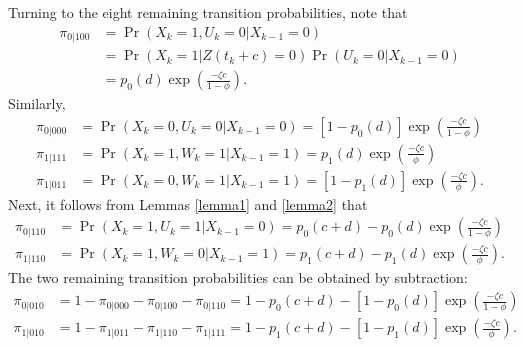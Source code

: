 \documentclass[man, noextraspace, floatsintext]{apa6}\usepackage[]{graphicx}\usepackage[]{color}
\begin{document}
Turning to the eight remaining transition probabilities, note that
\begin{align*}
\pi_{0|100} &= \Pr\left(X_k = 1, U_k = 0 | X_{k-1} = 0\right) \\
&= \Pr\left(X_k = 1 | Z(t_k + c) = 0\right) \Pr\left(U_k = 0 | X_{k-1} = 0\right) \\
&= p_0(d)\exp\left(\frac{- \zeta c}{1 - \phi}\right).
\end{align*}
Similarly,
\begin{align*}
\pi_{0|000} &= \Pr\left(X_k = 0, U_k = 0 | X_{k-1} = 0\right) = \left[1 - p_0(d)\right]\exp\left(\frac{- \zeta c}{1 - \phi}\right) \\
\pi_{1|111} &= \Pr\left(X_k = 1, W_k = 1 | X_{k-1} = 1\right) = p_1(d)\exp\left(\frac{- \zeta c}{\phi}\right) \\
\pi_{1|011} &= \Pr\left(X_k = 0, W_k = 1 | X_{k-1} = 1\right) = \left[1 - p_1(d)\right]\exp\left(\frac{- \zeta c}{\phi}\right).
\end{align*}
Next, it follows from Lemmas \ref{lemma1} and \ref{lemma2} that
\begin{align*}
\pi_{0|110} &= \Pr\left(X_k = 1, U_k = 1 | X_{k-1} = 0\right) = p_0(c + d) - p_0(d) \exp\left(\frac{- \zeta c}{1 - \phi}\right) \\
\pi_{1|110} &= \Pr\left(X_k = 1, W_k = 0 | X_{k-1} = 1\right) = p_1(c + d) - p_1(d) \exp\left(\frac{- \zeta c}{\phi}\right).
\end{align*}
The two remaining transition probabilities can be obtained by subtraction:
\begin{align*}
\pi_{0|010} &= 1 - \pi_{0|000} - \pi_{0|100} - \pi_{0|110} = 1 - p_0(c + d) - \left[1 - p_0(d)\right]\exp\left(\frac{- \zeta c}{1 - \phi}\right) \\
\pi_{1|010} &= 1 - \pi_{1|011} - \pi_{1|110} - \pi_{1|111} = 1 - p_1(c + d) - \left[1 - p_1(d)\right]\exp\left(\frac{- \zeta c}{\phi}\right).
\end{align*}
\end{document}

